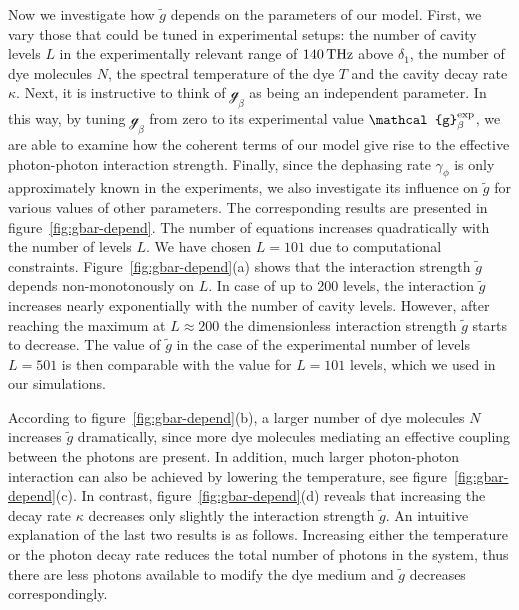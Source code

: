 \documentclass[12pt, a4paper]{iopart}
\begin{document}
{Now we investigate how $\tilde{g}$ depends on the parameters of our model. First, we vary those that could be tuned in experimental setups: the number of cavity levels $L$ in the experimentally relevant range of $140\,{\rm THz}$ above $\delta_1$, the number of dye molecules $N$, the spectral temperature of the dye $T$ and the cavity decay rate $\kappa$. Next, it is instructive to think of $\mathcal{g}_\beta$ as being an independent parameter. In this way, by tuning $\mathcal{g}_\beta$ from zero to its experimental value $\mathcal{g}_\beta^{\rm exp}$, we are able to examine how the coherent terms of our model give rise to the effective photon-photon interaction strength. Finally, since the dephasing rate $\gamma_\phi$ is only approximately known in the experiments, we also investigate its influence on $\tilde{g}$ for various values of other parameters.} The corresponding results are presented in figure~\ref{fig:gbar-depend}. The  number of equations increases quadratically with the number of levels $L$. We have chosen $L=101$ due to computational constraints. Figure~\ref{fig:gbar-depend}(a) shows that the interaction strength $\tilde{g}$ depends non-monotonously on $L$. In case of up to 200 levels, the interaction $\tilde{g}$ increases nearly exponentially with the number of cavity levels. However, after reaching the maximum at $L\approx 200$ the dimensionless interaction strength $\tilde{g}$ starts to decrease. The value of $\tilde{g}$ in the case of the experimental number of levels $L=501$ is then comparable with the value for $L=101$ levels, which we used in our simulations.

According to figure~\ref{fig:gbar-depend}(b), a larger number of dye molecules $N$ increases $\tilde{g}$ dramatically, since more dye molecules mediating an effective coupling between the photons are present. In addition, much larger photon-photon interaction can also be achieved by lowering the temperature, see figure~\ref{fig:gbar-depend}(c). In contrast, figure~\ref{fig:gbar-depend}(d) reveals that increasing the decay rate $\kappa$ decreases only slightly the interaction strength $\tilde{g}$. An intuitive explanation of the last two results is as follows. Increasing either the temperature or the photon decay rate reduces the total number of photons in the system, thus there are less photons available to modify the dye medium and $\tilde{g}$ decreases correspondingly.
\end{document}
